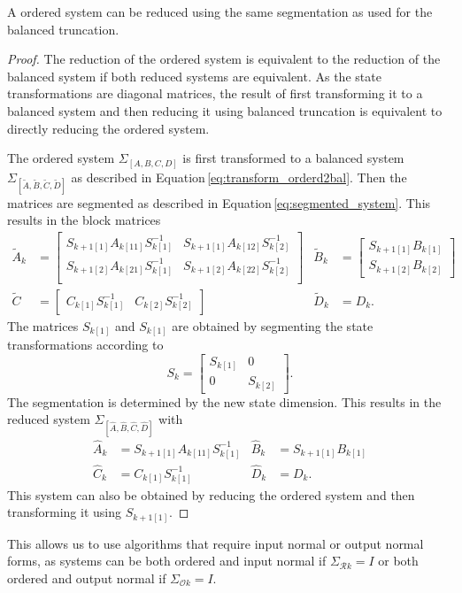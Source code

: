 \documentclass[numbers=noenddot,doctype=mastersthesis,BCOR=15mm,biblatex]{ldvbook}%
\newcommand{\R}{\mathcal{R}} %
\newcommand{\Ob}{\mathcal{O}} %
\newcommand{\eye}{I} %
\begin{document}
A ordered system can be reduced using the same segmentation as used for the balanced truncation.
\begin{proof}
	The reduction of the ordered system is equivalent to the reduction of the balanced system if both reduced systems are equivalent.  
	As the state transformations are diagonal matrices, the result of first transforming it to a balanced system and then reducing it using balanced truncation is equivalent to directly reducing the ordered system. %
	
	The ordered system $\Sigma_{[A,B,C,D]}$ is first transformed to a balanced system $\Sigma_{[\tilde{A},\tilde{B},\tilde{C},\tilde{D}]}$ as described in Equation\,\ref{eq:transform_orderd2bal}.
	Then the matrices are segmented as described in Equation\,\ref{eq:segmented_system}.
	This results in the block matrices
	\begin{subequations}
	\begin{align}
	\tilde{A}_k &=\begin{bmatrix}
	S_{k+1[1]}A_{k[11]}S_{k[1]}^{-1} & S_{k+1[1]}A_{k[12]}S_{k[2]}^{-1} \\
	S_{k+1[2]}A_{k[21]}S_{k[1]}^{-1} & S_{k+1[2]}A_{k[22]}S_{k[2]}^{-1} \\
	\end{bmatrix}
	&
	\tilde{B}_k &= \begin{bmatrix}
	S_{k+1[1]}B_{k[1]} \\ S_{k+1[2]}B_{k[2]}
	\end{bmatrix} 
	\\
	\tilde{C} &= \begin{bmatrix}
	C_{k[1]}S_{k[1]}^{-1} & C_{k[2]}S_{k[2]}^{-1}
	\end{bmatrix}& 
	\tilde{D}_k&=D_k
	.
	\end{align}
	\end{subequations}
	The matrices $	S_{k[1]}$ and $S_{k[1]}$ are obtained by segmenting the state transformations according to
	\begin{equation}
		S_k = 
		\begin{bmatrix}
		S_{k[1]} & 0\\
		0 & S_{k[2]}
		\end{bmatrix}
		.
	\end{equation}
	The segmentation is determined by the new state dimension.
	This results in the reduced system $\Sigma_{[\hat{A},\hat{B},\hat{C},\hat{D}]}$ with
	\begin{align}
	\hat{A}_k &= S_{k+1[1]}A_{k[11]}S_{k[1]}^{-1}  & \hat{B}_k &= S_{k+1[1]}B_{k[1]}\\
	\hat{C}_k &=C_{k[1]}S_{k[1]}^{-1}     & \hat{D}_k &= D_k
	.
	\end{align}
	This system can also be obtained by reducing the ordered system and then transforming it using $S_{k+1[1]}$.
\end{proof}
This allows us to use algorithms that require input normal or output normal forms, as systems can be both ordered and input normal if $\Sigma_{\R k}=\eye$ or both ordered and output normal if $\Sigma_{\Ob k}=\eye$.
\end{document}
